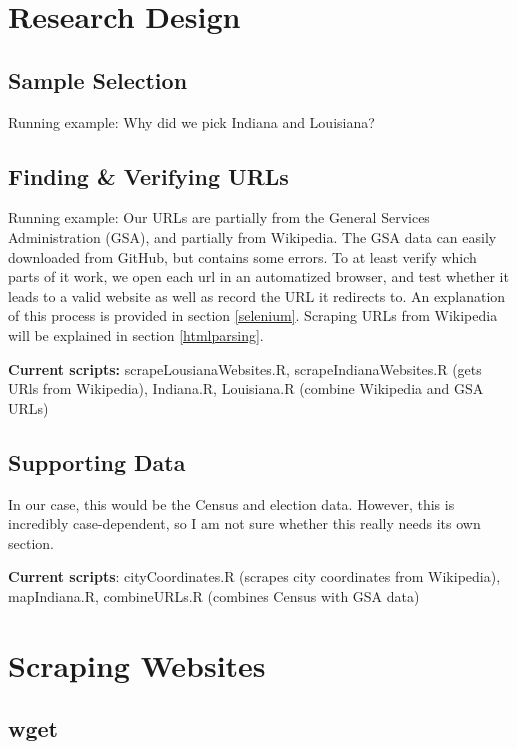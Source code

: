 \documentclass[11pt]{article}
\begin{document}
\newpage
\tableofcontents
\newpage
\section{Research Design}

\subsection{Sample Selection}

Running example: Why did we pick Indiana and Louisiana?

\subsection{Finding \& Verifying URLs}

Running example: Our URLs are partially from the General Services Administration (GSA), and partially from Wikipedia. The GSA data can easily downloaded from GitHub, but contains some errors. To at least verify which parts of it work, we open each url in an automatized browser, and test whether it leads to a valid website as well as record the URL it redirects to. An explanation of this process is provided in section \ref{selenium}. Scraping URLs from Wikipedia will be explained in section \ref{htmlparsing}.

\textbf{Current scripts:} scrapeLousianaWebsites.R, scrapeIndianaWebsites.R (gets URls from Wikipedia), Indiana.R, Louisiana.R (combine Wikipedia and GSA URLs)


\subsection{Supporting Data}
In our case, this would be the Census and election data. However, this is incredibly case-dependent, so I am not sure whether this really needs its own section.

\textbf{Current scripts}: cityCoordinates.R (scrapes city coordinates from Wikipedia), mapIndiana.R, combineURLs.R (combines Census with GSA data)

\section{Scraping Websites}
\subsection{wget}
\end{document}
